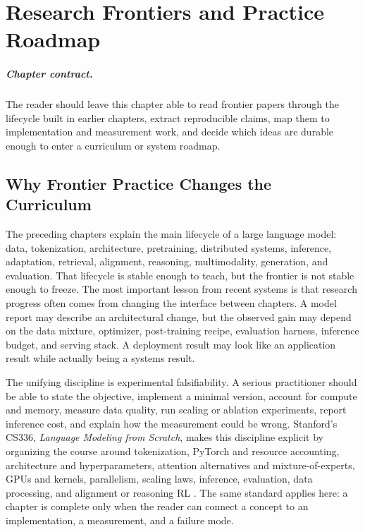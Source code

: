 \chapter{Research Frontiers and Practice Roadmap}
\label{ch:research-frontiers-practice}


\paragraph{Chapter contract.} The reader should leave this chapter able to read frontier papers through the lifecycle built in earlier chapters, extract reproducible claims, map them to implementation and measurement work, and decide which ideas are durable enough to enter a curriculum or system roadmap.

\section{Why Frontier Practice Changes the Curriculum}
\label{sec:why-frontier-chapter}

The preceding chapters explain the main lifecycle of a large language model: data, tokenization, architecture, pretraining, distributed systems, inference, adaptation, retrieval, alignment, reasoning, multimodality, generation, and evaluation. That lifecycle is stable enough to teach, but the frontier is not stable enough to freeze. The most important lesson from recent systems is that research progress often comes from changing the interface between chapters. A model report may describe an architectural change, but the observed gain may depend on the data mixture, optimizer, post-training recipe, evaluation harness, inference budget, and serving stack. A deployment result may look like an application result while actually being a systems result.

The unifying discipline is experimental falsifiability. A serious practitioner should be able to state the objective, implement a minimal version, account for compute and memory, measure data quality, run scaling or ablation experiments, report inference cost, and explain how the measurement could be wrong. Stanford's CS336, \emph{Language Modeling from Scratch}, makes this discipline explicit by organizing the course around tokenization, PyTorch and resource accounting, architecture and hyperparameters, attention alternatives and mixture-of-experts, GPUs and kernels, parallelism, scaling laws, inference, evaluation, data processing, and alignment or reasoning RL \cite{stanfordcs3362026}. The same standard applies here: a chapter is complete only when the reader can connect a concept to an implementation, a measurement, and a failure mode.

